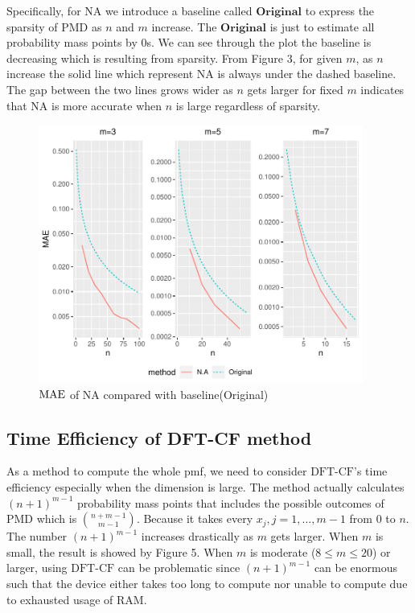 \documentclass[12pt]{article}
\newcommand{\MAE}{{\rm MAE}}
\newcommand{\PMD}{\textrm{PMD}}
\newcommand{\NA}{{\textrm{NA}}}
\newcommand{\dft}{{\textrm{DFT-CF}}}
\begin{document}
Specifically, for $\NA$ we introduce a baseline called $\textbf{Original}$ to express the sparsity of $\PMD$ as $n$ and $m$ increase. The $\textbf{Original}$ is just to estimate all probability mass points by 0s. We can see through the plot the baseline is decreasing which is resulting from sparsity. From Figure 3, for given $m$, as $n$ increase the solid line which represent $\NA$ is always under the dashed baseline. The gap between the two lines grows wider as $n$ gets larger for fixed $m$ indicates that $\NA$ is more accurate when $n$ is large regardless of sparsity.
\begin{figure}%
	\centering
	\includegraphics[width=0.95\textwidth]{figures/mae.pdf}
	\caption{$\MAE$ of $\NA$ compared with baseline(Original)}
	\label{fig: dft accuracy}
\end{figure}



\subsection{Time Efficiency of DFT-CF method}
As a method to compute the whole pmf, we need to consider $\dft$'s time efficiency especially when the dimension is large. The method actually calculates $(n+1)^{m-1}$ probability mass points that includes the possible outcomes of $\PMD$ which is $\binom{n+m-1}{m-1}$. Because it takes every $x_j,j=1,\dots,m-1$ from 0 to $n$. The number $(n+1)^{m-1}$ increases drastically as $m$ gets larger. When $m$ is small, the result is showed by Figure 5. When $m$ is moderate ($8 \leq m \leq 20$) or larger, using $\dft$ can be problematic since $(n+1)^{m-1}$ can be enormous such that the device either takes too long to compute nor unable to compute due to exhausted usage of RAM.
\end{document}
